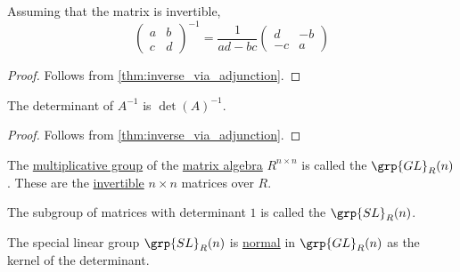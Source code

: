 \begin{proposition}\label{thm:inverse_of_2x2_matrix}
  Assuming that the matrix is invertible,
  \begin{equation*}
    \begin{pmatrix}
      a & b \\
      c & d
    \end{pmatrix}^{-1}
    =
    \frac 1 {ad - bc}
    \begin{pmatrix}
      d  & -b \\
      -c & a
    \end{pmatrix}
  \end{equation*}
\end{proposition}
\begin{proof}
  Follows from \cref{thm:inverse_via_adjunction}.
\end{proof}

\begin{proposition}\label{thm:determinant_of_inverse}
  The determinant of \( A^{-1} \) is \( \det(A)^{-1} \).
\end{proposition}
\begin{proof}
  Follows from \cref{thm:inverse_via_adjunction}.
\end{proof}

\begin{definition}\label{def:linear_groups}\mimprovised
  The \hyperref[def:semiring]{multiplicative group} of the \hyperref[thm:matrix_algebra]{matrix algebra} \( R^{n \times n} \) is called the  \( \grp{GL}_R(n) \). These are the \hyperref[def:inverse_matrix]{invertible} \( n \times n \) matrices over \( R \).

  The subgroup of matrices with determinant \( 1 \) is called the  \( \grp{SL}_R(n) \).
\end{definition}
\begin{comments}
  \item The special linear group \( \grp{SL}_R(n) \) is \hyperref[def:normal_subgroup]{normal} in \( \grp{GL}_R(n) \) as the kernel of the determinant.
\end{comments}

